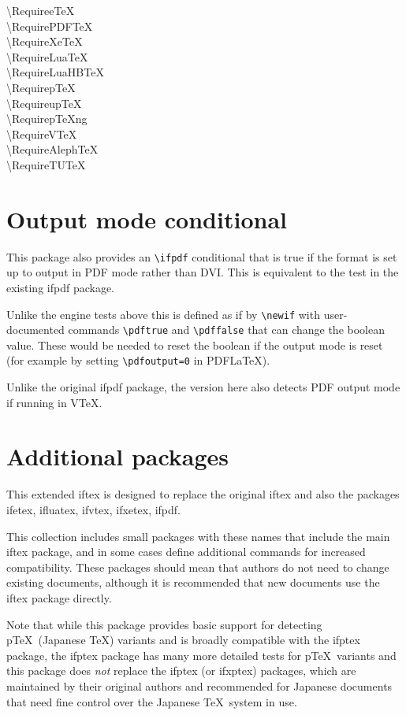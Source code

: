 \documentclass{article}
\newcommand\cs[1]{{\ttfamily\textbackslash #1}}
\begin{document}
\begin{description}
\item[\cs{RequireeTeX}]
\item[\cs{RequirePDFTeX}]
\item[\cs{RequireXeTeX}]
\item[\cs{RequireLuaTeX}]
\item[\cs{RequireLuaHBTeX}]
\item[\cs{RequirepTeX}]
\item[\cs{RequireupTeX}]
\item[\cs{RequirepTeXng}]
\item[\cs{RequireVTeX}]
\item[\cs{RequireAlephTeX}]
\item[\cs{RequireTUTeX}]
\end{description}


\section{Output mode conditional}
This package also provides an \verb|\ifpdf| conditional that is true
if the format is set up to output in PDF mode rather than DVI. This is
equivalent to the test in the existing \textsf{ifpdf} package.

Unlike the engine tests above this is defined as if by \verb|\newif|
with user-documented commands \verb|\pdftrue| and \verb|\pdffalse| that can
change the boolean value. These would be needed to reset the boolean
if the output mode is reset (for example by setting
\verb|\pdfoutput=0| in PDF\LaTeX).

Unlike the original \textsf{ifpdf} package, the version here also
detects PDF output mode if running in V\TeX.

\section{Additional packages}
This extended \textsf{iftex} is designed to replace the original
\textsf{iftex} and also the packages
\textsf{ifetex},
\textsf{ifluatex},
\textsf{ifvtex},
\textsf{ifxetex},
\textsf{ifpdf}.

This collection includes small packages with these names that include
the main \textsf{iftex} package, and in some cases define additional
commands for increased compatibility. These packages should mean that
authors do not need to change existing documents, although it is
recommended that new documents use the \textsf{iftex} package
directly.


Note that while this package provides basic support for detecting
p\TeX\ (Japanese \TeX) variants and is broadly compatible with the
\textsf{ifptex} package, the \textsf{ifptex} package has many more detailed
tests for p\TeX\ variants and this package does \emph{not} replace the
\textsf{ifptex} (or \textsf{ifxptex}) packages, which are maintained
by their original authors and recommended for Japanese documents that
need fine control over the Japanese \TeX\ system in use.
\end{document}
